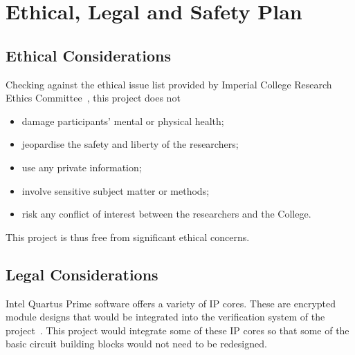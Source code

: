 \section{Ethical, Legal and Safety Plan}

\subsection{Ethical Considerations}

Checking against the ethical issue list provided by Imperial College Research
Ethics Committee~\cite{Imperial1}, this project does not
\begin{itemize}
  \item damage participants' mental or physical health;
  \item jeopardise the safety and liberty of the researchers;
  \item use any private information;
  \item involve sensitive subject matter or methods;
  \item risk any conflict of interest between the researchers and the College.
\end{itemize}
This project is thus free from significant ethical concerns.

\subsection{Legal Considerations}
Intel Quartus Prime software offers a variety of IP cores.
These are encrypted module designs that would be integrated into the
verification system of the project~\cite{Intel2}.
This project would integrate some of these IP cores so that some of the basic
circuit building blocks would not need to be redesigned.

